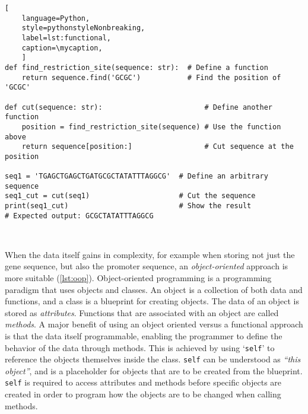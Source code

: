 \def\mycaption{ Example of functional programming in Python. The code
    defines a function called ``\texttt{find\_restriction\_site}'' that
    finds the position of a restriction site in a DNA sequence. The function
    ``\texttt{cut}'' uses the function ``\texttt{find\_restriction\_site}''
    to cut the sequence at the restriction site. To execute both functions,
    we first define an arbitrary DNA sequence and then call the function
    \texttt{cut} passing the sequence as an argument.
}
\begin{lstlisting}[
    language=Python,
    style=pythonstyleNonbreaking,
    label=lst:functional,
    caption=\mycaption,
    ]
def find_restriction_site(sequence: str):  # Define a function
    return sequence.find('GCGC')           # Find the position of 'GCGC'
    
def cut(sequence: str):                        # Define another function
    position = find_restriction_site(sequence) # Use the function above
    return sequence[position:]                 # Cut sequence at the position
    
seq1 = 'TGAGCTGAGCTGATGCGCTATATTTAGGCG'  # Define an arbitrary sequence
seq1_cut = cut(seq1)                     # Cut the sequence
print(seq1_cut)                          # Show the result
# Expected output: GCGCTATATTTAGGCG
    
    
\end{lstlisting}


When the data itself gains in complexity, for example when storing not just the
gene sequence, but also the promoter sequence, an \emph{object-oriented}
approach is more suitable (\autoref{lst:oop}). Object-oriented programming is a
programming paradigm that uses objects and classes. An object is a collection of
both data and functions, and a class is a blueprint for creating objects. The
data of an object is stored as \emph{attributes}. Functions that are associated
with an object are called \emph{methods}. A major benefit of using an object
oriented versus a functional approach is that the data itself programmable,
enabling the programmer to define the behavior of the data through methods. This
is achieved by using `\texttt{self}' to reference the objects themselves inside
the class. \texttt{self} can be understood as \textit{``this object''}, and is a
placeholder for objects that are to be created from the blueprint. \texttt{self}
is required to access attributes and methods before specific objects are created
in order to program how the objects are to be changed when calling methods.


